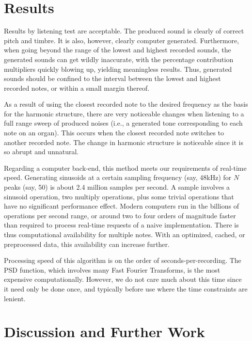 \documentclass[twocolumn]{article}
\begin{document}
\section{Results}

Results by listening test are acceptable. The produced sound is clearly of correct pitch and timbre. It is also, however, clearly computer generated. Furthermore, when going beyond the range of the lowest and highest recorded sounds, the generated sounds can get wildly inaccurate, with the percentage contribution multipliers quickly blowing up, yielding meaningless results. Thus, generated sounds should be confined to the interval between the lowest and highest recorded notes, or within a small margin thereof.

As a result of using the closest recorded note to the desired frequency as the basis for the harmonic structure, there are very noticeable changes when listening to a full range sweep of produced noises (i.e., a generated tone corresponding to each note on an organ). This occurs when the closest recorded note switches to another recorded note. The change in harmonic structure is noticeable since it is so abrupt and unnatural.

Regarding a computer back-end, this method meets our requirements of real-time speed. Generating sinusoids at a certain sampling frequency (say, 48kHz) for $N$ peaks (say, 50) is about 2.4 million samples per second. A sample involves a sinusoid operation, two multiply operations, plus some trivial operations that have no significant performance effect. Modern computers run in the billions of operations per second range, or around two to four orders of magnitude faster than required to process real-time requests of a naive implementation. There is thus computational availability for multiple notes. With an optimized, cached, or preprocessed data, this availability can increase further.

Processing speed of this algorithm is on the order of seconds-per-recording. The PSD function, which involves many Fast Fourier Transforms, is the most expensive computationally. However, we do not care much about this time since it need only be done once, and typically before use where the time constraints are lenient.

\section{Discussion and Further Work}
\end{document}
